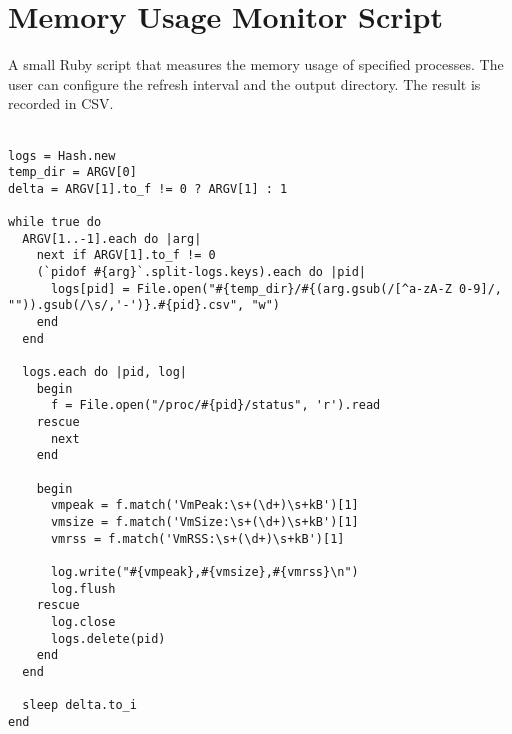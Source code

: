 \chapter{Memory Usage Monitor Script} %
\label{ap:ruby19_encoding_patch}

A small Ruby script that measures the memory usage of specified processes. The user can configure the refresh interval and the output directory. The result is recorded in CSV.\\\\

\begin{lstlisting}
logs = Hash.new
temp_dir = ARGV[0]
delta = ARGV[1].to_f != 0 ? ARGV[1] : 1

while true do
  ARGV[1..-1].each do |arg|
    next if ARGV[1].to_f != 0
    (`pidof #{arg}`.split-logs.keys).each do |pid|
      logs[pid] = File.open("#{temp_dir}/#{(arg.gsub(/[^a-zA-Z 0-9]/, "")).gsub(/\s/,'-')}.#{pid}.csv", "w")
    end
  end

  logs.each do |pid, log|
    begin
      f = File.open("/proc/#{pid}/status", 'r').read
    rescue
      next
    end
    
    begin
      vmpeak = f.match('VmPeak:\s+(\d+)\s+kB')[1]
      vmsize = f.match('VmSize:\s+(\d+)\s+kB')[1]
      vmrss = f.match('VmRSS:\s+(\d+)\s+kB')[1]

      log.write("#{vmpeak},#{vmsize},#{vmrss}\n")
      log.flush
    rescue
      log.close
      logs.delete(pid)
    end
  end
  
  sleep delta.to_i
end
\end{lstlisting}
